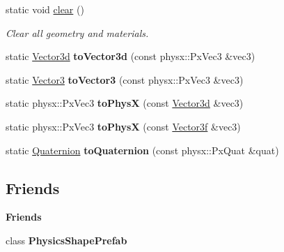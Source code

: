 \begin{DoxyCompactItemize}
static void \mbox{\hyperlink{classrev_1_1_physics_manager_addd6eb058f6152941391c6e60b11f7c4}{clear}} ()
\begin{DoxyCompactList}\small\item\em Clear all geometry and materials. \end{DoxyCompactList}\item 
\mbox{\label{classrev_1_1_physics_manager_ad7e7ef4bfa4856f1a9effc5ede84bdd5}} 
static \mbox{\hyperlink{classrev_1_1_vector}{Vector3d}} {\bfseries to\+Vector3d} (const physx\+::\+Px\+Vec3 \&vec3)
\item 
\mbox{\label{classrev_1_1_physics_manager_a873ed420164d78da7cb8a1e5a6932af9}} 
static \mbox{\hyperlink{classrev_1_1_vector}{Vector3}} {\bfseries to\+Vector3} (const physx\+::\+Px\+Vec3 \&vec3)
\item 
\mbox{\label{classrev_1_1_physics_manager_a51442ccee345a9f33e6cea56f7154c6b}} 
static physx\+::\+Px\+Vec3 {\bfseries to\+PhysX} (const \mbox{\hyperlink{classrev_1_1_vector}{Vector3d}} \&vec3)
\item 
\mbox{\label{classrev_1_1_physics_manager_a58fdb5e46cd47300328340a8d2127e54}} 
static physx\+::\+Px\+Vec3 {\bfseries to\+PhysX} (const \mbox{\hyperlink{classrev_1_1_vector}{Vector3f}} \&vec3)
\item 
\mbox{\label{classrev_1_1_physics_manager_aefff9dcc0eb57279e90f5df2defd992f}} 
static \mbox{\hyperlink{classrev_1_1_quaternion}{Quaternion}} {\bfseries to\+Quaternion} (const physx\+::\+Px\+Quat \&quat)
\end{DoxyCompactItemize}
\subsection*{Friends}
\begin{Indent}\textbf{ Friends}\par
\begin{DoxyCompactItemize}
\item 
\mbox{\label{classrev_1_1_physics_manager_a9881a4ed7014790bc7a68fecdb9b646a}} 
class {\bfseries Physics\+Shape\+Prefab}
\end{DoxyCompactItemize}
\end{Indent}
